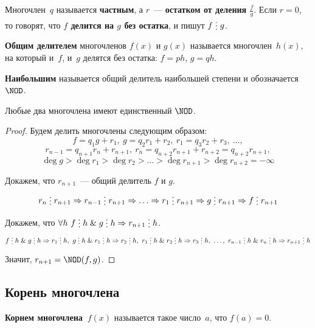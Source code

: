 Многочлен~$q$ называется \textbf{частным}, а $r$~--- \textbf{остатком от деления $\frac{f}g$}.
Если $r = 0$, то говорят, что \textbf{$f$ делится на $g$ без остатка}, и пишут $f \mult g$.

\textbf{Общим делителем} многочленов $f(x)$ и $g(x)$ называется многочлен~$h(x)$, на который и~$f$, и~$g$ делятся без остатка: $f = ph$, $g = qh$.

\textbf{Наибольшим} называется общий делитель наибольшей степени и обозначается $\NOD$.

\begin{theorem}
Любые два многочлена имеют единственный $\NOD$.
\end{theorem}
\begin{proof}
Будем делить многочлены следующим образом:
\begin{equation*}
f = q_1 g + r_1, \
g = q_2 r_1 + r_2, \
r_1 = q_3 r_2 + r_3, \ \ldots,
\end{equation*}
\begin{equation*}
r_{n-1} = q_{n+1} r_n + r_{n+1}, \
r_n = q_{n+2} r_{n+1} + r_{n+2} = q_{n+2} r_{n+1},
\end{equation*}
\begin{equation*}
\deg g > \deg r_1 > \deg r_2 > \ldots > \deg r_{n+1} > \deg r_{n+2} = -\infty
\end{equation*}

Докажем, что $r_{n+1}$~--- общий делитель $f$ и $g$.
\begin{equation*}
r_n \mult r_{n+1} \Rightarrow
r_{n-1} \mult r_{n+1} \Rightarrow
\ldots \Rightarrow
r_1 \mult r_{n+1} \Rightarrow
g \mult r_{n+1} \Rightarrow
f \mult r_{n+1}
\end{equation*}

Докажем, что $\forall h \ f \mult h \lAnd g \mult h \Rightarrow r_{n+1} \mult h$.
\begin{equation*}
f \mult h \lAnd g \mult h \Rightarrow r_1 \mult h, \
g \mult h \lAnd r_1 \mult h \Rightarrow r_2 \mult h, \
r_1 \mult h \lAnd r_2 \mult h \Rightarrow r_3 \mult h, \ \ldots, \
r_{n-1} \mult h \lAnd r_n \mult h \Rightarrow r_{n+1} \mult h
\end{equation*}

Значит, $r_{n+1} = \NOD(f, g)$.
\end{proof}

\subsection{Корень многочлена}
\index{Корень} \textbf{Корнем многочлена~$f(x)$} называется такое число~$a$, что $f(a) = 0$.

